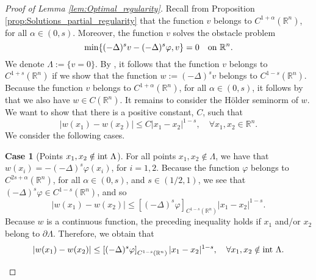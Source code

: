 \documentclass[11pt,reqno]{amsart}
\theoremstyle{definition}
\newtheorem{case}{Case}
\theoremstyle{remark}
\begin{document}
\begin{proof}[Proof of Lemma \ref{lem:Optimal_regularity}]
Recall from Proposition \ref{prop:Solutions_partial_regularity} that the function $v$ belongs to $C^{1+\alpha}({\mathbb{R}}^n)$, for all $\alpha\in (0,s)$. Moreover, the function $v$ solves the obstacle problem 
$$
\min\{(-\Delta)^s v-(-\Delta)^s \varphi, v\}=0\quad\hbox{on }{\mathbb{R}}^n.
$$
We denote $\Lambda :=\{v=0\}.$ By \cite[Proposition 2.8]{Silvestre_2007}, it follows that the function $v$ belongs to $C^{1+s}({\mathbb{R}}^n)$ if we show that the function $w:=(-\Delta)^s v$ belongs to $C^{1-s}({\mathbb{R}}^n)$. Because the function $v$ belongs to $C^{1+\alpha}({\mathbb{R}}^n)$, for all $\alpha\in (0,s)$, it follows by \cite[Proposition 2.6]{Silvestre_2007} that we also have $w \in C({\mathbb{R}}^n)$. It remains to consider the H\"older seminorm of $w$. We want to show that there is a positive constant, $C$, such that
\begin{equation}
\label{eq:Holder_seminorm_w}
|w(x_1)-w(x_2)|\leq C|x_1-x_2|^{1-s},\quad\forall x_1,x_2\in{\mathbb{R}}^n.
\end{equation}
We consider the following cases.

\setcounter{case}{0}
\begin{case}[Points $x_1,x_2\notin\hbox{int }\Lambda$]
\label{case:Both_points_outside_Lambda}
For all points $x_1,x_2\notin\Lambda$, we have that $w(x_i)=-(-\Delta)^s\varphi(x_i)$, for $i=1,2.$ Because the function $\varphi$ belongs to $C^{2s+\alpha}({\mathbb{R}}^n)$, for all $\alpha \in (0,s)$, and $s\in (1/2,1)$, we see that $(-\Delta)^s\varphi \in C^{1-s}({\mathbb{R}}^n)$, and so
$$
|w(x_1)-w(x_2)|\leq \left[(-\Delta)^s\varphi\right]_{C^{1-s}({\mathbb{R}}^n)}|x_1-x_2|^{1-s}.
$$
Because $w$ is a continuous function, the preceding inequality holds if $x_1$ and/or $x_2$ belong to $\partial\Lambda$. Therefore, we obtain that
$$
|w(x_1)-w(x_2)|\leq \left[(-\Delta)^s\varphi\right]_{C^{1-s}({\mathbb{R}}^n)}|x_1-x_2|^{1-s},\quad\forall x_1,x_2\notin\hbox{int }\Lambda.
$$
\end{case}


\end{proof}
\end{document}
